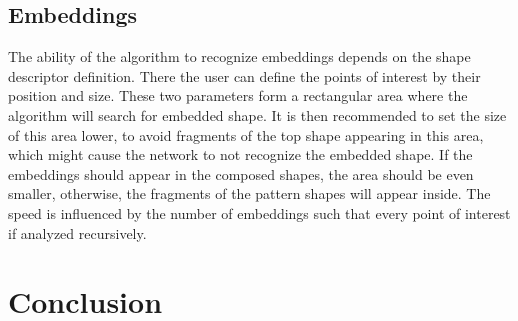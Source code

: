 \section{Embeddings}
The ability of the algorithm to recognize embeddings depends on the shape descriptor definition. There the user can define the points of interest by their position and size. These two parameters form a rectangular area where the algorithm will search for embedded shape. It is then recommended to set the size of this area lower, to avoid fragments of the top shape appearing in this area, which might cause the network to not recognize the embedded shape. If the embeddings should appear in the composed shapes, the area should be even smaller, otherwise, the fragments of the pattern shapes will appear inside. The speed is influenced by the number of embeddings such that every point of interest if analyzed recursively.


\chapter*{Conclusion}

